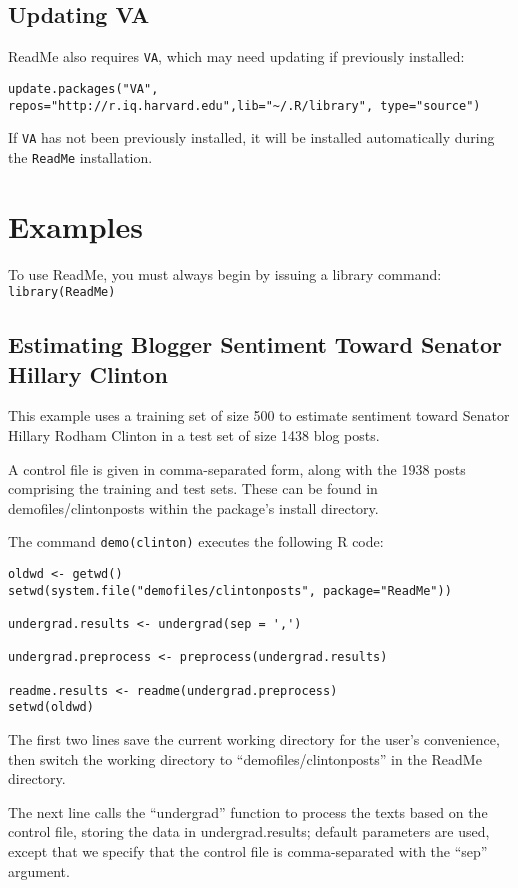 \documentclass[oneside,letterpaper,titlepage]{article}
\begin{document}
\subsection{Updating VA}

ReadMe also requires \texttt{VA}, which may need updating if previously installed:
\begin{verbatim}
update.packages("VA", repos="http://r.iq.harvard.edu",lib="~/.R/library", type="source")
\end{verbatim}
If \texttt{VA} has not been previously installed, it will be installed
automatically during the \texttt{ReadMe} installation.

\section{Examples}

To use ReadMe, you must always begin by issuing a library command:
\texttt{library(ReadMe)}

\subsection{Estimating Blogger Sentiment Toward Senator Hillary Clinton}
This example uses a training set of size 500 to estimate sentiment
toward Senator Hillary Rodham Clinton in a test set of size 1438 blog
posts.

A control file is given in comma-separated form, along with the 1938
posts comprising the training and test sets. These can be found in
demofiles/clintonposts within the package's install directory.

The command \texttt{demo(clinton)} executes the following R code:
\begin{verbatim}
oldwd <- getwd()
setwd(system.file("demofiles/clintonposts", package="ReadMe"))

undergrad.results <- undergrad(sep = ',')

undergrad.preprocess <- preprocess(undergrad.results)

readme.results <- readme(undergrad.preprocess)
setwd(oldwd)
\end{verbatim}

The first two lines save the current working directory for the user's
convenience, then switch the working directory to
``demofiles/clintonposts'' in the ReadMe directory.

The next line calls the ``undergrad'' function to process the texts
based on the control file, storing the data in undergrad.results; default
parameters are used, except that we specify that the control file is
comma-separated with the ``sep'' argument.
\end{document}
